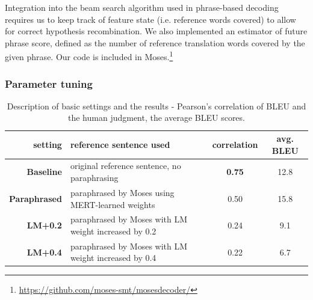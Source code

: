 \documentclass[11pt]{article}
\def\footurl#1{\footnote{\url{#1}}}
\begin{document}
Integration into the beam search algorithm used in phrase-based decoding
requires us to keep track of feature state (i.e. reference words covered) to
allow for correct hypothesis recombination. We also implemented an estimator of
future phrase score, defined as the number of reference translation words
covered by the given phrase. Our code is included in
Moses.\footurl{https://github.com/moses-smt/mosesdecoder/}

\subsubsection{Parameter tuning}

\begin{table}[tb]
\begin{tabular}{r|l|c|c}
setting & reference sentence used & correlation & avg. BLEU \\
\hline
\textbf{Baseline} & original reference sentence, no paraphrasing & \textbf{0.75} & 12.8 \\
\textbf{Paraphrased} & paraphrased by Moses using MERT-learned weights  & 0.50  & 15.8 \\
\textbf{LM+0.2}  & paraphrased by Moses with LM weight increased by 0.2  & 0.24 & 9.1 \\
\textbf{LM+0.4} & paraphrased by Moses with LM weight increased by 0.4  & 0.22 & 6.7 \\
\end{tabular}
\caption{Description of basic settings and the results - Pearson's correlation of BLEU and the
human judgment, the average BLEU scores.} 
\label{settings}
\end{table}
\end{document}
